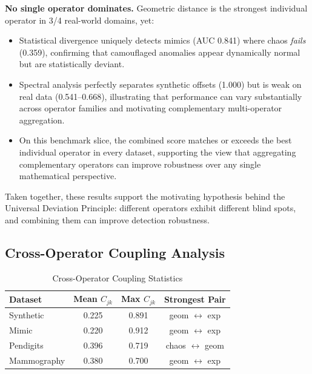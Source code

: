 \documentclass[journal]{IEEEtran}
\begin{document}
\textbf{No single operator dominates.} Geometric distance is the strongest individual operator in 3/4 real-world domains, yet:
\begin{itemize}
  \item Statistical divergence uniquely detects mimics (AUC 0.841) where chaos \textit{fails} (0.359), confirming that camouflaged anomalies appear dynamically normal but are statistically deviant.
  \item Spectral analysis perfectly separates synthetic offsets (1.000) but is weak on real data (0.541--0.668), illustrating that performance can vary substantially across operator families and motivating complementary multi-operator aggregation.
  \item On this benchmark slice, the combined score matches or exceeds the best individual operator in every dataset, supporting the view that aggregating complementary operators can improve robustness over any single mathematical perspective.
\end{itemize}

Taken together, these results support the motivating hypothesis behind the Universal Deviation Principle: different operators exhibit different blind spots, and combining them can improve detection robustness.

\subsection{Cross-Operator Coupling Analysis}
\label{ssec:coupling_results}

\begin{table}[!t]
\centering
\caption{Cross-Operator Coupling Statistics}
\label{tab:coupling}
\begin{tabular}{@{}lccc@{}}
\toprule
\textbf{Dataset} & \textbf{Mean $C_{jk}$} & \textbf{Max $C_{jk}$} & \textbf{Strongest Pair} \\
\midrule
Synthetic & 0.225 & 0.891 & geom $\leftrightarrow$ exp \\
Mimic & 0.220 & 0.912 & geom $\leftrightarrow$ exp \\
Pendigits & 0.396 & 0.719 & chaos $\leftrightarrow$ geom \\
Mammography & 0.380 & 0.700 & geom $\leftrightarrow$ exp \\
\bottomrule
\end{tabular}
\end{table}
\end{document}
